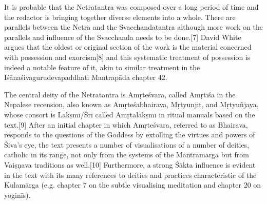 It is probable that the Netratantra was composed over a long period of time and the redactor is bringing together diverse elements into a whole. There are parallels between the Netra and the Svacchandatantra although more work on the parallels and influence of the Svacchanda needs to be done.[7] David White argues that the oldest or original section of the work is the material concerned with possession and exorcism[8] and this systematic treatment of possession is indeed a notable feature of it, akin to similar treatment in the Īśānaśivagurudevapaddhati Mantrapāda chapter 42.

The central deity of the Netratantra is Amṛteśvara, called Amṛtīśa in the Nepalese recension, also known as Amṛteśabhairava, Mṛtyunjit, and Mṛtyuñjaya, whose consort is Lakṣmī/Śrī called Amṛtalakṣmī in ritual manuals based on the text.[9] After an initial chapter in which Amṛteśvara, referred to as Bhairava, responds to the questions of the Goddess by extolling the virtues and powers of Śiva’s eye, the text presents a number of visualisations of a number of deities, catholic in its range, not only from the systems of the Mantramārga but from Vaiṣṇava traditions as well.[10] Furthermore, a strong Śākta influence is evident in the text with its many references to deities and practices characteristic of the Kulamārga (e.g. chapter 7 on the subtle visualising meditation and chapter 20 on yoginīs).

